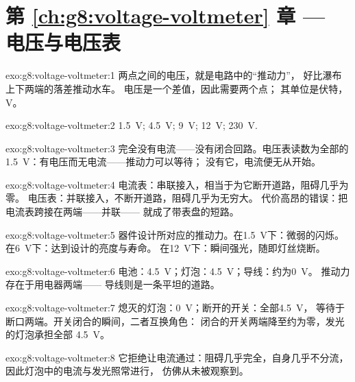 \section*{第 \ref{ch:g8:voltage-voltmeter} 章 --- 电压与电压表}

\begin{solution}{exo:g8:voltage-voltmeter:1}
两点之间的电压，就是电路中的“推动力”，
好比瀑布上下两端的落差推动水车。
电压是一个差值，因此需要两个点；
其单位是伏特，\unit{V}。
\end{solution}

\begin{solution}{exo:g8:voltage-voltmeter:2}
\qty{1.5}{V}; \qty{4.5}{V}; \qty{9}{V}; \qty{12}{V};
\qty{230}{V}.
\end{solution}

\begin{solution}{exo:g8:voltage-voltmeter:3}
完全没有电流——没有闭合回路。电压表读数为全部的
\qty{1.5}{V}：有电压而无电流——推动力可以等待；
没有它，电流便无从开始。
\end{solution}

\begin{solution}{exo:g8:voltage-voltmeter:4}
电流表：串联接入，相当于为它断开道路，阻碍几乎为零。
电压表：并联接入，不断开道路，阻碍几乎为无穷大。
代价高昂的错误：把电流表跨接在两端——并联——
就成了带表盘的短路。
\end{solution}

\begin{solution}{exo:g8:voltage-voltmeter:5}
器件设计所对应的推动力。在\qty{1.5}{V}下：微弱的闪烁。
在\qty{6}{V}下：达到设计的亮度与寿命。
在\qty{12}{V}下：瞬间强光，随即灯丝烧断。
\end{solution}

\begin{solution}{exo:g8:voltage-voltmeter:6}
电池：\qty{4.5}{V}；灯泡：\qty{4.5}{V}；导线：约为\qty{0}{V}。
推动力存在于用电器两端——
导线则是一条平坦的道路。
\end{solution}

\begin{solution}{exo:g8:voltage-voltmeter:7}
熄灭的灯泡：\qty{0}{V}；断开的开关：全部\qty{4.5}{V}，
等待于断口两端。开关闭合的瞬间，二者互换角色：
闭合的开关两端降至约为零，发光的灯泡承担全部
\qty{4.5}{V}。
\end{solution}

\begin{solution}{exo:g8:voltage-voltmeter:8}
它拒绝让电流通过：阻碍几乎完全，自身几乎不分流，
因此灯泡中的电流与发光照常进行，
仿佛从未被观察到。
\end{solution}

